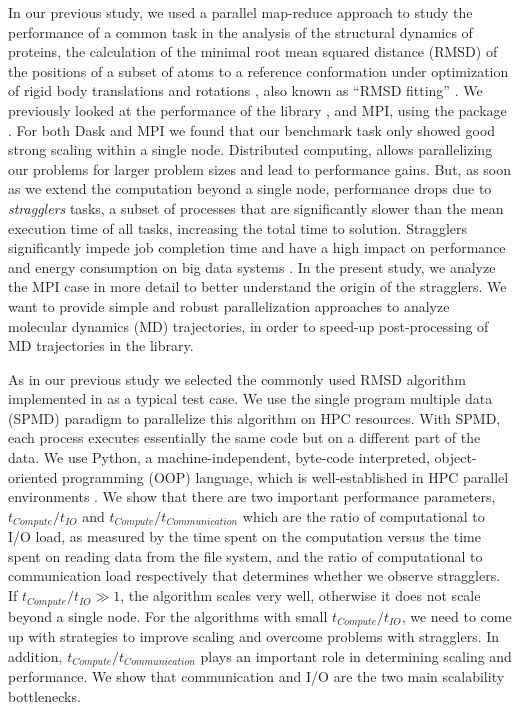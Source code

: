 In our previous study, we used a parallel map-reduce approach to study the performance of a common task in the analysis of the structural dynamics of proteins, the calculation of the minimal root mean squared distance (RMSD) of the positions of a subset of atoms to a reference conformation under optimization of rigid body translations and rotations \cite{Khoshlessan:2017ab, ICCP-2018}, also known as ``RMSD fitting'' \cite{Liu:2010kx, Mura:2014kx}. 
We previously looked at the performance of the  library \cite{Rocklin:2015aa}, and MPI, using the  package \cite{Dalcin:2011aa, Dalcin:2005aa}. 
For both Dask and MPI we found that our benchmark task only showed good strong scaling within a single node.
Distributed computing, allows parallelizing our problems for larger problem sizes and lead to performance gains.
But, as soon as we extend the computation beyond a single node, performance drops due to \emph{stragglers} tasks, a subset of processes that are significantly slower than the mean execution time of all tasks, increasing the total time to solution.
Stragglers significantly impede job completion time \cite{Garraghan2016} and have a high impact on performance and energy consumption on big data systems \cite{Tien-2017}.
In the present study, we analyze the MPI case in more detail to better understand the origin of the stragglers.
We want to provide simple and robust parallelization approaches to analyze molecular dynamics (MD) trajectories, in order to speed-up post-processing of MD trajectories in the  library. 

As in our previous study we selected the commonly used RMSD algorithm implemented in  as a typical test case.
We use the single program multiple data (SPMD) paradigm to parallelize this algorithm on HPC resources.
With SPMD, each process executes essentially the same code but on a different part of the data. 
We use Python, a machine-independent, byte-code interpreted, object-oriented programming (OOP) language, which is well-established in HPC parallel environments \cite{GAiN}. 
We show that there are two important performance parameters, $t_{Compute}/t_{IO}$ and $t_{Compute}/t_{Communication}$ which are the ratio of computational to I/O load, as measured by the time spent on the computation versus the time spent on reading data from the file system, and the ratio of computational to communication load respectively that determines whether we observe stragglers.
If $t_{Compute}/t_{IO} \gg 1$, the algorithm scales very well, otherwise it does not scale beyond a single node.  
For the algorithms with small $t_{Compute}/t_{IO}$, we need to come up with strategies to improve scaling and overcome problems with stragglers.
In addition, $t_{Compute}/t_{Communication}$ plays an important role in determining scaling and performance.
We show that communication and I/O are the two main scalability bottlenecks.

